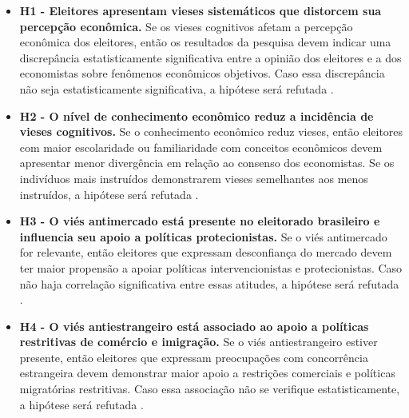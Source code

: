 \begin{itemize}

    \item \textbf{H1 - Eleitores apresentam vieses sistemáticos que distorcem sua percepção econômica.}  
    Se os vieses cognitivos afetam a percepção econômica dos eleitores, então os resultados da pesquisa devem indicar uma discrepância estatisticamente significativa entre a opinião dos eleitores e a dos economistas sobre fenômenos econômicos objetivos. Caso essa discrepância não seja estatisticamente significativa, a hipótese será refutada \cite{The_Myth_of_the_Rational_Voter}.  

    \item \textbf{H2 - O nível de conhecimento econômico reduz a incidência de vieses cognitivos.}  
    Se o conhecimento econômico reduz vieses, então eleitores com maior escolaridade ou familiaridade com conceitos econômicos devem apresentar menor divergência em relação ao consenso dos economistas. Se os indivíduos mais instruídos demonstrarem vieses semelhantes aos menos instruídos, a hipótese será refutada \cite{downs1957economic, Judgment_under_Uncertainty}.  

    \item \textbf{H3 - O viés antimercado está presente no eleitorado brasileiro e influencia seu apoio a políticas protecionistas.}  
    Se o viés antimercado for relevante, então eleitores que expressam desconfiança do mercado devem ter maior propensão a apoiar políticas intervencionistas e protecionistas. Caso não haja correlação significativa entre essas atitudes, a hipótese será refutada \cite{The_Myth_of_the_Rational_Voter, sowell2004applied}.  

    \item \textbf{H4 - O viés antiestrangeiro está associado ao apoio a políticas restritivas de comércio e imigração.}  
    Se o viés antiestrangeiro estiver presente, então eleitores que expressam preocupações com concorrência estrangeira devem demonstrar maior apoio a restrições comerciais e políticas migratórias restritivas. Caso essa associação não se verifique estatisticamente, a hipótese será refutada \cite{The_Myth_of_the_Rational_Voter, bhagwati2003free}.  


\end{itemize}
